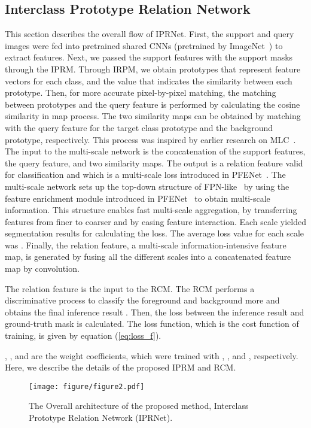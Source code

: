\documentclass[runningheads]{llncs}
\begin{document}
\subsection{Interclass Prototype Relation Network}
This section describes the overall flow of IPRNet.
First, the support and query images were fed into pretrained shared CNNs (pretrained by ImageNet~\cite{ImageNet}) to extract features.
Next, we passed the support features with the support masks through the IPRM. Through IRPM, we obtain prototypes that represent feature vectors for each class, and the value  that indicates the similarity between each prototype.
Then, for more accurate pixel-by-pixel matching, the matching between prototypes and the query feature is performed by calculating the cosine similarity in map process.
The two similarity maps can be obtained by matching with the query feature for the target class prototype and the background prototype, respectively.
This process was inspired by earlier research on MLC~\cite{MLC}.
The input to the multi-scale network is the concatenation of the support features, the query feature, and two similarity maps. The output is a relation feature valid for classification and  which is a multi-scale loss introduced in PFENet~\cite{PFENet}.
The multi-scale network sets up the top-down structure of FPN-like~\cite{FPN} by using the feature enrichment module introduced in PFENet~\cite{PFENet} to obtain multi-scale information.
This structure enables fast multi-scale aggregation, by transferring features from finer to coarser and by easing feature interaction.
Each scale yielded segmentation results for calculating the loss. The average loss value for each scale was .
Finally, the relation feature, a multi-scale information-intensive feature map, is generated by fusing all the different scales into a concatenated feature map by convolution.

The relation feature is the input to the RCM.
The RCM performs a discriminative process to classify the foreground and background more and obtains the final inference result . Then, the loss  between the inference result and ground-truth mask  is calculated.
The loss function, which is the cost function of training, is given by equation (\ref{eq:loss_f}).

, , and  are the weight coefficients, which were trained with , , and , respectively.
Here, we describe the details of the proposed IPRM and RCM.
\begin{figure}[t]
  \texttt{[image: figure/figure2.pdf]}
  \caption{The Overall architecture of the proposed method, Interclass Prototype Relation Network (IPRNet).}
  \label{fig:overrall}
\end{figure}
\end{document}

